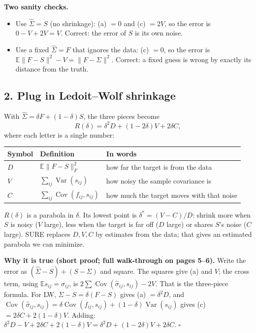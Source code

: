 \documentclass[12pt]{article}
\begin{document}
\textbf{Two sanity checks.}
\begin{itemize}
\item Use $\hat\Sigma=S$ (no shrinkage): (a) $=0$ and (c) $=2V$, so the error is $0-V+2V=V$. Correct: the
error of $S$ is its own noise.
\item Use a fixed $\hat\Sigma=F$ that ignores the data: (c) $=0$, so the error is $\mathbb{E}\|F-S\|^2-V=\|F-\Sigma\|^2$.
Correct: a fixed guess is wrong by exactly its distance from the truth.
\end{itemize}

\subsection*{2. Plug in Ledoit--Wolf shrinkage}
With $\hat\Sigma=\delta F+(1-\delta)S$, the three pieces become
\[
R(\delta)=\delta^2D+(1-2\delta)V+2\delta C,
\]
where each letter is a single number:
\begin{center}
\begin{tabular}{@{}lll@{}}
\toprule
Symbol & Definition & In words \\
\midrule
$D$ & $\mathbb{E}\|F-S\|_F^2$ & how far the target is from the data \\
$V$ & $\sum_{ij}\operatorname{Var}(s_{ij})$ & how noisy the sample covariance is \\
$C$ & $\sum_{ij}\operatorname{Cov}(f_{ij},s_{ij})$ & how much the target moves with that noise \\
\bottomrule
\end{tabular}
\end{center}
$R(\delta)$ is a parabola in $\delta$. Its lowest point is $\delta^*=(V-C)/D$: shrink more when $S$ is
noisy ($V$ large), less when the target is far off ($D$ large) or shares $S$'s noise ($C$ large).
SURE replaces $D,V,C$ by estimates from the data; that gives an estimated parabola we can minimize.

\textbf{Why it is true (short proof; full walk-through on pages 5--6).} Write the error as $(\hat\Sigma-S)+(S-\Sigma)$ and square. The
squares give (a) and $V$; the cross term, using $\mathbb{E}s_{ij}=\sigma_{ij}$, is
$2\sum\operatorname{Cov}(\hat\sigma_{ij},s_{ij})-2V$. That is the three-piece formula. For LW,
$\hat\Sigma-S=\delta(F-S)$ gives (a) $=\delta^2D$, and
$\operatorname{Cov}(\hat\sigma_{ij},s_{ij})=\delta\operatorname{Cov}(f_{ij},s_{ij})+(1-\delta)\operatorname{Var}(s_{ij})$
gives (c) $=2\delta C+2(1-\delta)V$. Adding: $\delta^2D-V+2\delta C+2(1-\delta)V=\delta^2D+(1-2\delta)V+2\delta C$. \hfill$\square$
\end{document}
